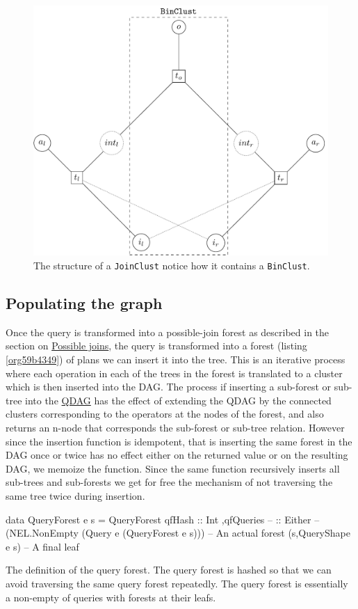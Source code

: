 \begin{figure}[p]
  \centering
  \includegraphics[width=.9\linewidth]{./imgs/joinclust.pdf}
  \caption{\label{fig:orgf1d2858}The structure of a \texttt{JoinClust} notice how it contains a \texttt{BinClust}.}
\end{figure}


\subsection{Populating the graph}
\label{sec:orgf8560ae}
Once the query is transformed into a possible-join forest as described
in the section on \hyperref[sec:org2eb887b]{Possible joins}, the query is transformed into a
forest (listing \ref{org59b4349}) of plans we can insert it into
the tree. This is an iterative process where each operation in each of
the trees in the forest is translated to a cluster which is then
inserted into the DAG. The process if inserting a sub-forest or
sub-tree into the \hyperref[sec:org5a9ec3b]{QDAG} has the effect of extending the QDAG by the
connected clusters corresponding to the operators at the nodes of the
forest, and also returns an n-node that corresponds the sub-forest or
sub-tree relation. However since the insertion function is idempotent,
that is inserting the same forest in the DAG once or twice has no
effect either on the returned value or on the resulting DAG, we
memoize the function. Since the same function recursively inserts all
sub-trees and sub-forests we get for free the mechanism of not
traversing the same tree twice during insertion.

\begin{listing}[p]
  \begin{haskell}
    data QueryForest e s =
    QueryForest
    { qfHash :: Int
      ,qfQueries --
      :: Either --
      (NEL.NonEmpty (Query e (QueryForest e s))) -- An actual forest
      (s,QueryShape e s) -- A final leaf
    }
  \end{haskell}
  \caption{\label{org59b4349}The definition of the query forest. The query forest is hashed so that we can avoid traversing the  same query forest repeatedly. The query forest is essentially a non-empty of queries  with forests at their leafs.}
\end{listing}


